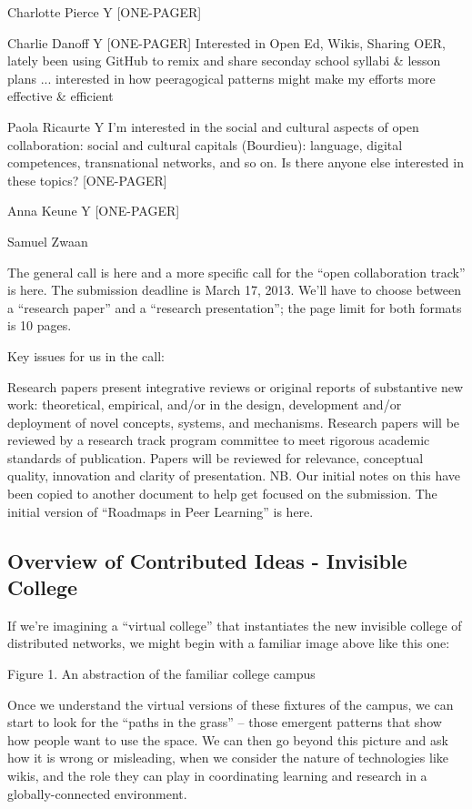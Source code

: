 \documentclass{acm_proc_article-sp}
\begin{document}
    Charlotte Pierce Y [ONE-PAGER]

    Charlie Danoff Y [ONE-PAGER] Interested in Open Ed, Wikis, Sharing OER, lately been using GitHub to remix and share seconday school syllabi \& lesson plans ... interested in how peeragogical patterns might make my efforts more effective \& efficient

    Paola Ricaurte Y I'm interested in the social and cultural aspects of open collaboration: social and cultural capitals (Bourdieu): language, digital competences, transnational networks, and so on. Is there anyone else interested in these topics? [ONE-PAGER]

    Anna Keune Y [ONE-PAGER]

    Samuel Zwaan 


The general call is here and a more specific call for the ``open collaboration track'' is here. The submission deadline is March 17, 2013. We'll have to choose between a ``research paper'' and a ``research presentation''; the page limit for both formats is 10 pages.

Key issues for us in the call:

Research papers present integrative reviews or original reports of substantive new work: theoretical, empirical, and/or in the design, development and/or deployment of novel concepts, systems, and mechanisms. Research papers will be reviewed by a research track program committee to meet rigorous academic standards of publication. Papers will be reviewed for relevance, conceptual quality, innovation and clarity of presentation.
NB. Our initial notes on this have been copied to another document to help get focused on the submission. The initial version of ``Roadmaps in Peer Learning'' is here.

\subsection{Overview of Contributed Ideas - Invisible College}

If we're imagining a ``virtual college'' that instantiates the new invisible college of distributed networks, we might begin with a familiar image above like this one:

Figure 1. An abstraction of the familiar college campus

Once we understand the virtual versions of these fixtures of the campus, we can start to look for the ``paths in the grass'' -- those emergent patterns that show how people want to use the space. We can then go beyond this picture and ask how it is wrong or misleading, when we consider the nature of technologies like wikis, and the role they can play in coordinating learning and research in a globally-connected environment.
\end{document}

